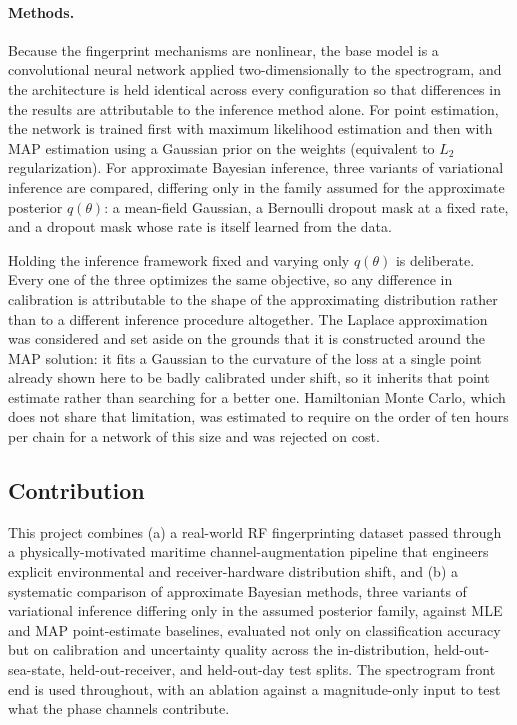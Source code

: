 \documentclass{article}
\begin{document}
\paragraph{Methods.}
Because the fingerprint mechanisms are nonlinear, the base model is a convolutional
neural network applied two-dimensionally to the spectrogram, and the architecture is held
identical across every configuration so that differences in the results are attributable
to the inference method alone. For point estimation, the network is trained first with
maximum likelihood estimation and then with MAP estimation using a Gaussian prior on the
weights (equivalent to $L_2$ regularization). For approximate Bayesian inference, three
variants of variational inference are compared, differing only in the family assumed for
the approximate posterior $q(\theta)$: a mean-field Gaussian, a Bernoulli dropout mask at
a fixed rate, and a dropout mask whose rate is itself learned from the data.

Holding the inference framework fixed and varying only $q(\theta)$ is deliberate. Every
one of the three optimizes the same objective, so any difference in calibration is
attributable to the shape of the approximating distribution rather than to a different
inference procedure altogether. The Laplace approximation was considered and set aside on
the grounds that it is constructed around the MAP solution: it fits a Gaussian to the
curvature of the loss at a single point already shown here to be badly calibrated under
shift, so it inherits that point estimate rather than searching for a better one. Hamiltonian
Monte Carlo, which does not share that limitation, was estimated to require on the order of
ten hours per chain for a network of this size and was rejected on cost.

\subsection{Contribution}

This project combines (a) a real-world RF fingerprinting dataset passed through a
physically-motivated maritime channel-augmentation pipeline that engineers explicit
environmental and receiver-hardware distribution shift, and (b) a systematic comparison of
approximate Bayesian methods, three variants of variational inference differing only in
the assumed posterior family, against MLE and MAP point-estimate baselines,
evaluated not only on classification accuracy but on calibration and uncertainty quality
across the in-distribution, held-out-sea-state, held-out-receiver, and held-out-day test
splits. The spectrogram front end is used throughout, with an ablation against a
magnitude-only input to test what the phase channels contribute.
\end{document}

